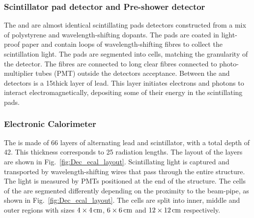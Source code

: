 \subsubsection{Scintillator pad detector and Pre-shower detector}

The \spd and \presh are almost identical scintillating pads detectors constructed from a mix of polystyrene and wavelength-shifting dopants. The pads are coated in light-proof paper and contain loops of wavelength-shifting fibres to collect the scintillation light. The pads are segmented into cells, matching the granularity of the \ecal detector.
The fibres are connected to long clear fibres connected to photo-multiplier tubes (PMT) outside the detectors acceptance. Between the \spd and \presh detectors is a 15\mm thick layer of lead. This layer initiates electrons and photons to interact electromagnetically, depositing some of their energy in the \presh scintillating pads.    


\subsubsection{Electronic Calorimeter}


The \ecal is made of 66 layers of alternating lead and scintillator, with a total depth of 42\cm. This thickness corresponds to 25 radiation lengths. The layout of the layers are shown in Fig.~\ref{fig:Dec_ecal_layout}. Scintillating light is captured and transported by wavelength-shifting wires that pass through the entire structure. The light is measured by PMTs positioned at the end of the structure. The cells of the \ecal are segmented differently depending on the proximity to the beam-pipe, as shown in Fig.~\ref{fig:Dec_ecal_layout}. The cells are split into inner, middle and outer regions with sizes $4\times 4\mathrm{ \,cm}$, $6\times 6\mathrm{ \,cm}$ and $12\times 12\mathrm{ \,cm}$ respectively. 

